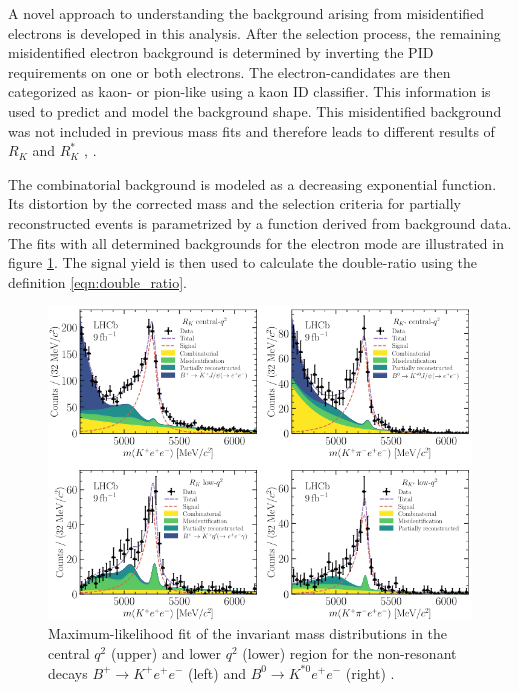 A novel approach to understanding the background arising from misidentified 
electrons is developed in this analysis. After the selection process, the remaining 
misidentified electron background is determined by inverting the PID requirements 
on one or both electrons. The electron-candidates are then categorized as kaon- or 
pion-like using a kaon ID classifier. This information is used to predict and model 
the background shape.
This misidentified background was not included in previous mass fits and therefore
leads to different results of $R_K$ and $R_K^*$ \cite{previous_RK}, \cite{previous_RK*}.

The combinatorial background is modeled as a decreasing exponential function. 
Its distortion by the corrected mass and the selection criteria for partially 
reconstructed events is parametrized by a function derived from background data. 
The fits with all determined backgrounds for the electron mode are illustrated in 
figure \ref{fig:fits}. 
The signal yield is then used to calculate 
the double-ratio using the definition \eqref{eqn:double_ratio}.

\begin{figure}
    \centering
    \includegraphics[width=\linewidth]{figures/fits.png}
    \caption{Maximum-likelihood fit of the invariant mass distributions in the central $q^2$ (upper) and lower $q^2$ (lower) region for the non-resonant decays $B^+\to K^+e^+e^-$ (left) and $B^0\to K^{*0}e^+e^-$ (right) \cite{lhcbcollaboration2022test}.}
    \label{fig:fits}
\end{figure}

